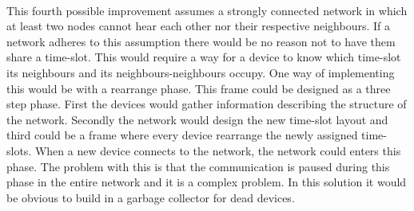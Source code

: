 \begin{description}[labelindent=\parindent]
    \item[Parallelise communication]\hfill\\
This fourth possible improvement assumes a strongly connected network in which at least two nodes cannot hear each other nor their respective neighbours.
If a network adheres to this assumption there would be no reason not to have them share a time-slot.
This would require a way for a device to know which time-slot its neighbours and its neighbours-neighbours occupy.
One way of implementing this would be with a rearrange phase.
This frame could be designed as a three step phase. 
First the devices would gather information describing the structure of the network.
Secondly the network would design the new time-slot layout and third could be a frame where every device rearrange the newly assigned time-slots.
When a new device connects to the network, the network could enters this phase.
The problem with this is that the communication is paused during this phase in the entire network and it is a complex problem.
In this solution it would be obvious to build in a garbage collector for dead devices.
\end{description}


